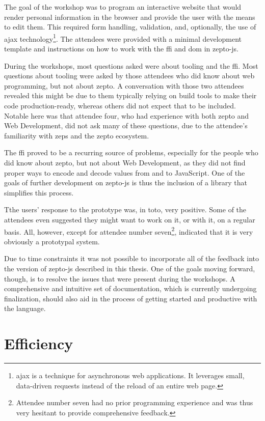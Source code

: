 \documentclass[oneside,11pt,xetex]{scrbook}
\begin{document}
The goal of the workshop was to program an interactive website that would
render personal information in the browser and provide the user with the means
to edit them. This required form handling, validation, and, optionally, the
use of \gls{ajax} technology\footnote{\gls{ajax} is a technique for asynchronous
web applications. It leverages small, data-driven requests instead of the reload
of an entire web page.}. The attendees were provided with a minimal development
template and instructions on how to work with the \gls{ffi} and \gls{dom} in zepto-js.

During the workshops, most questions asked were about tooling and the \gls{ffi}.
Most questions about tooling were asked by those attendees who did know about
web programming, but not about zepto. A conversation with those two attendees
revealed this might be due to them typically relying on build tools to make
their code production-ready, whereas others did not expect that to be included.
Notable here was that attendee four, who had experience with both zepto and Web
Development, did not ask many of these questions, due to the attendee's familiarity
with \gls{zeps} and the zepto ecosystem.

The \gls{ffi} proved to be a recurring source of problems, especially for the
people who did know about zepto, but not about Web Development, as they did not
find proper ways to encode and decode values from and to JavaScript. One of the
goals of further development on zepto-js is thus the inclusion of a library that
simplifies this process.

Tthe users' response to the prototype was, in toto, very positive. Some
of the attendees even suggested they might want to work on it, or with it, on
a regular basis. All, however, except for attendee number seven\footnote{Attendee
number seven had no prior programming experience and was thus very hesitant to
provide comprehensive feedback.}, indicated that it is very obviously a prototypal
system.

Due to time constraints it was not possible to incorporate all of the feedback into
the version of zepto-js described in this thesis. One of the goals moving forward, though,
is to resolve the issues that were present during the workshops. A comprehensive
and intuitive set of documentation, which is currently undergoing finalization, should
also aid in the process of getting started and productive with the language.

\section{Efficiency}
\end{document}
